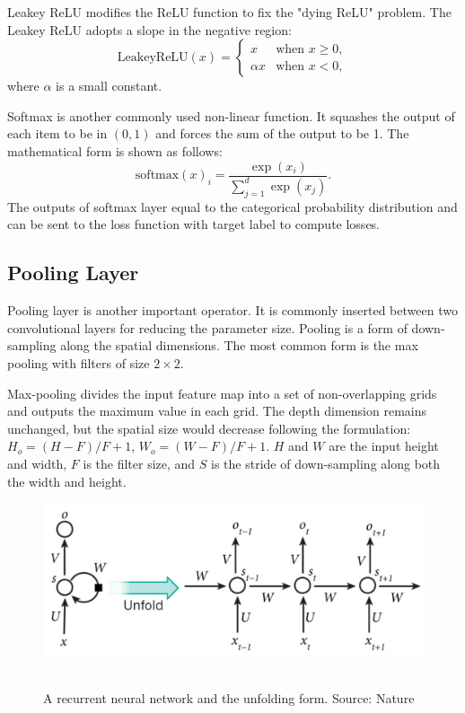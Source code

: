 Leakey ReLU modifies the ReLU function to fix the "dying ReLU" problem. The Leakey ReLU adopts a slope in the negative region:
\begin{equation}
  \mathrm{Leakey ReLU}(x) = \begin{cases}
    x & \text{when }x \ge 0,\\
    \alpha x & \text{when }x < 0,
  \end{cases}
\end{equation}
where $\alpha$ is a small constant.

Softmax is another commonly used non-linear function. It squashes the output of each item to be in $(0,1)$ and forces the sum of the output to be 1. The mathematical form is shown as follows:
\begin{equation} \label{eq:softmax}
  \mathrm{softmax}(x)_i=\frac{\exp(x_i)}{\sum_{j=1}^d \exp(x_j)}.
\end{equation}
The outputs of softmax layer equal to the categorical probability distribution and can be sent to the loss function with target label to compute losses. 

\subsection{Pooling Layer}
Pooling layer is another important operator. It is commonly inserted between two convolutional layers for reducing the parameter size. Pooling is a form of down-sampling along the spatial dimensions. The most common form is the max pooling with filters of size $2\times 2$. 

Max-pooling divides the input feature map into a set of non-overlapping grids and outputs the maximum value in each grid. The depth dimension remains unchanged, but the spatial size would decrease following the formulation: $H_o = (H-F)/F+1$, $W_o = (W-F)/F+1$. $H$ and $W$ are the input height and width, $F$ is the filter size, and $S$ is the stride of down-sampling along both the width and height.

\begin{figure}
\begin{center}
\includegraphics[width=0.9\linewidth]{figures/rnn.pdf} \ \\
\end{center}
\caption{A recurrent neural network and the unfolding form. Source: Nature}
\label{dl:rnn}
\end{figure}

